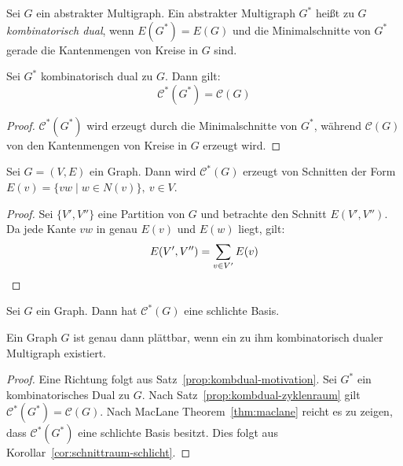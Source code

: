 \documentclass[10pt,b5paper]{article}
\begin{document}
\begin{definition}
Sei $G$ ein abstrakter Multigraph. Ein abstrakter Multigraph $G^\ast$ heißt zu $G$ \textit{kombinatorisch dual}, wenn $E(G^\ast) = E(G)$ und die Minimalschnitte von $G^\ast$ gerade die Kantenmengen von Kreise in $G$ sind.
\end{definition}

\begin{proposition}\label{prop:kombdual-zyklenraum}
Sei $G^\ast$ kombinatorisch dual zu $G$. Dann gilt:
\[ \mathcal{C}^\ast(G^\ast) =\mathcal{C}(G) \]
\end{proposition}

\begin{proof}
$\mathcal{C}^\ast(G^\ast)$ wird erzeugt durch die Minimalschnitte von $G^\ast$, während $\mathcal{C}(G)$ von den Kantenmengen von Kreise in $G$ erzeugt wird.
\end{proof}

\begin{lemma}\label{lem:schnittraum-schlicht}
Sei $G=(V, E)$ ein Graph. Dann wird $\mathcal{C}^\ast(G)$ erzeugt von Schnitten der Form $E(v) = \{vw\mid w\in N(v) \},\ v\in V$.
\end{lemma}

\begin{proof}
Sei $\{V', V''\}$ eine Partition von $G$ und betrachte den Schnitt $E(V', V'')$. Da jede Kante $vw$ in genau $E(v)$ und $E(w)$ liegt, gilt:
\[ E(V', V'') = \sum_{v\in V'} E(v) \qedhere \]
\end{proof}

\begin{corollary}\label{cor:schnittraum-schlicht}
Sei $G$ ein Graph. Dann hat $\mathcal{C}^\ast(G)$ eine schlichte Basis.
\end{corollary}

\begin{theorem}
Ein Graph $G$ ist genau dann plättbar, wenn ein zu ihm kombinatorisch dualer Multigraph existiert.
\end{theorem}

\begin{proof}
Eine Richtung folgt aus Satz~\ref{prop:kombdual-motivation}. Sei $G^\ast$ ein kombinatorisches Dual zu $G$. Nach Satz~\ref{prop:kombdual-zyklenraum} gilt $\mathcal{C}^\ast(G^\ast) =\mathcal{C}(G)$. Nach MacLane Theorem~\ref{thm:maclane} reicht es zu zeigen, dass $\mathcal{C}^\ast(G^\ast)$ eine schlichte Basis besitzt. Dies folgt aus Korollar~\ref{cor:schnittraum-schlicht}.
\end{proof}
\end{document}
